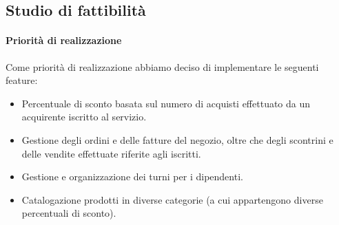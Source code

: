 \subsection{Studio di fattibilit\`a} 

\paragraph*{Priorit\`a di realizzazione}
Come priorit\`a di realizzazione abbiamo deciso di implementare le seguenti feature:
\begin{itemize}
\item Percentuale di sconto basata sul numero di acquisti effettuato da un acquirente iscritto al servizio.
\item Gestione degli ordini e delle fatture del negozio, oltre che degli scontrini e delle vendite effettuate riferite agli iscritti.
\item Gestione e organizzazione dei turni per i dipendenti.
  \item Catalogazione prodotti in diverse categorie (a cui appartengono diverse percentuali di sconto).
\end{itemize}
